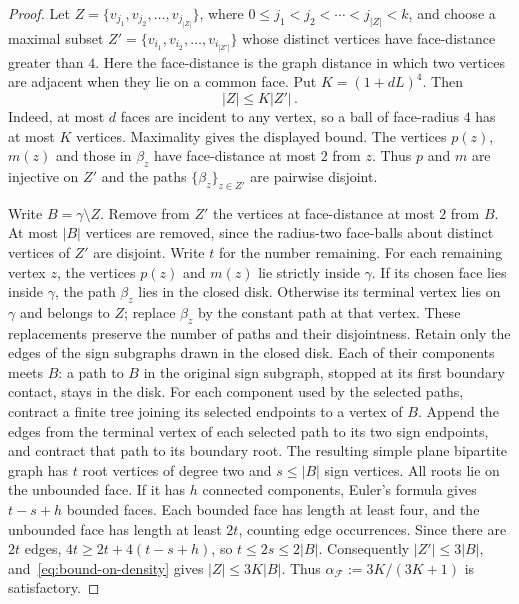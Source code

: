\documentclass{daj}
\begin{document}
\begin{proof}
	Let $Z = \{v_{j_1}, v_{j_2}, \dots, v_{j_{|Z|}}\}$, where $0 \leq j_1 < j_2 < \cdots < j_{|Z|} < k$,
	and choose a maximal subset $Z' = \{v_{i_1}, v_{i_2}, \dots, v_{i_{|Z'|}}\}$ whose distinct vertices have face-distance greater than $4$.
	Here the face-distance is the graph distance in which two vertices are adjacent when they lie on a common face.
	Put $K=(1+dL)^4$. Then
	\begin{equation} \label{eq:bound-on-density}
		|Z| \leq K |Z'| \, .
	\end{equation}
	Indeed, at most $d$ faces are incident to any vertex, so a ball of face-radius $4$ has at most $K$ vertices. Maximality gives the displayed bound. The vertices $p(z)$, $m(z)$ and those in $\beta_z$ have face-distance at most $2$ from $z$. Thus $p$ and $m$ are injective on $Z'$ and the paths $\{\beta_z\}_{z\in Z'}$ are pairwise disjoint.
	
	Write $B=\gamma\setminus Z$. Remove from $Z'$ the vertices at face-distance at most $2$ from $B$. At most $|B|$ vertices are removed, since the radius-two face-balls about distinct vertices of $Z'$ are disjoint. Write $t$ for the number remaining.
	For each remaining vertex $z$, the vertices $p(z)$ and $m(z)$ lie strictly inside $\gamma$. If its chosen face lies inside $\gamma$, the path $\beta_z$ lies in the closed disk. Otherwise its terminal vertex lies on $\gamma$ and belongs to $Z$; replace $\beta_z$ by the constant path at that vertex. These replacements preserve the number of paths and their disjointness.
	Retain only the edges of the sign subgraphs drawn in the closed disk. Each of their components meets $B$: a path to $B$ in the original sign subgraph, stopped at its first boundary contact, stays in the disk. For each component used by the selected paths, contract a finite tree joining its selected endpoints to a vertex of $B$. Append the edges from the terminal vertex of each selected path to its two sign endpoints, and contract that path to its boundary root.
	The resulting simple plane bipartite graph has $t$ root vertices of degree two and $s\leq |B|$ sign vertices. All roots lie on the unbounded face. If it has $h$ connected components, Euler's formula gives $t-s+h$ bounded faces. Each bounded face has length at least four, and the unbounded face has length at least $2t$, counting edge occurrences. Since there are $2t$ edges, $4t\geq2t+4(t-s+h)$, so $t\leq2s\leq2|B|$.
	Consequently $|Z'|\leq3|B|$, and~\eqref{eq:bound-on-density} gives $|Z|\leq3K|B|$. Thus $\alpha_{\mathcal F}:=3K/(3K+1)$ is satisfactory.
\end{proof}
\end{document}
